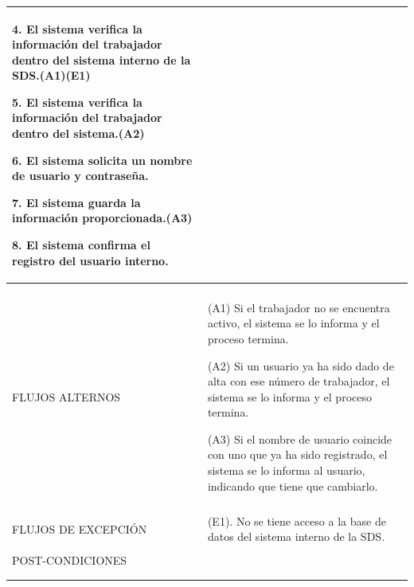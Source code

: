 \begin{longtable}{@{\extracolsep{8pt}}l p{8.5cm}}
 4. El sistema verifica la información del trabajador dentro del sistema interno de la SDS.(A1)(E1) \par\vspace{.1cm}

 5. El sistema verifica la información del trabajador dentro del sistema.(A2) \par\vspace{.1cm}

 6. El sistema solicita un nombre de usuario y contraseña. \par\vspace{.1cm}

 7. El sistema guarda la información proporcionada.(A3) \par\vspace{.1cm}

 8. El sistema confirma el registro del usuario interno. \par\vspace{.1cm}

   \par\vspace{.1cm}

\\
\hline \\[-1ex]

FLUJOS ALTERNOS & 
\par (A1) Si el trabajador no se encuentra activo, el sistema se lo informa y el proceso termina.

\par (A2) Si un usuario ya ha sido dado de alta con ese número de trabajador, el sistema se lo informa y el proceso termina.

\par (A3) Si el nombre de usuario coincide con uno que ya ha sido registrado, el sistema se lo informa al usuario, indicando que tiene que cambiarlo. 



\\
\hline \\[-1ex]

FLUJOS DE EXCEPCIÓN & 
\par\vspace{.1cm} (E1). No se tiene acceso a la base de datos del sistema interno de la SDS.


\\%

\hline \\[-1ex]
POST-CONDICIONES & 
\\
\hline
\hline \\[-1.8ex]
 \\
\end{longtable}


